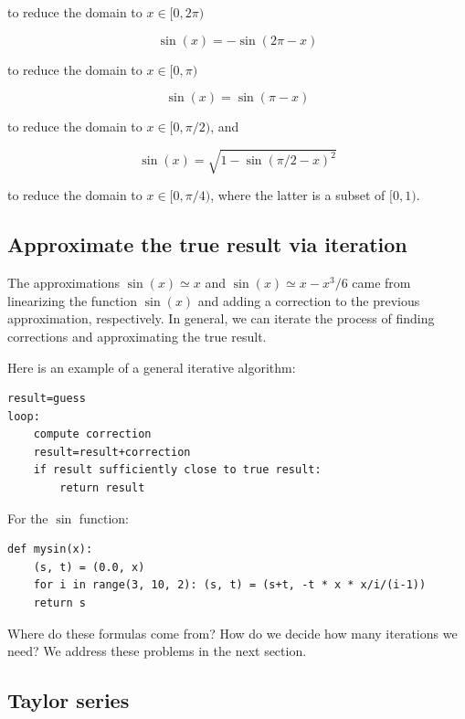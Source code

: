 \documentclass[justified, sixbynine]{tufte-book}
\theoremstyle{plain}%
\newtheorem * {corollary}{Corollary}
\theoremstyle{definition}
\theoremstyle{remark}
\newtheorem * {remark}{Remark}
\newtheorem * {note}{Note}
\begin{document}
\begin{fullwidth}
to reduce the domain to $x \in [0, 2\pi)$

\begin{equation}
\sin(x) = -\sin(2\pi - x)
\end{equation}

to reduce the domain to $x \in [0, \pi)$

\begin{equation}
\sin(x) = \sin(\pi - x)
\end{equation}

to reduce the domain to $x \in [0, \pi/2)$, and

\begin{equation}
\sin(x) = \sqrt{1 - \sin(\pi/2 - x)^2}
\end{equation}

to reduce the domain to $x \in [0, \pi/4)$, where the latter is a subset of $[0, 1)$.

\goodbreak\subsection{Approximate the true result via iteration}


The approximations $\sin(x) \simeq x$ and $\sin(x) \simeq x - x^3/6$ came from linearizing the function $\sin(x)$ and adding a correction to the previous approximation, respectively. In general, we can iterate the process of finding corrections and approximating the true result.

Here is an example of a general iterative algorithm:
\begin{lstlisting}
result=guess
loop:
    compute correction
    result=result+correction
    if result sufficiently close to true result:
        return result
\end{lstlisting}

For the $\sin$ function:

\begin{lstlisting}
def mysin(x):
    (s, t) = (0.0, x)
    for i in range(3, 10, 2): (s, t) = (s+t, -t * x * x/i/(i-1))
    return s
\end{lstlisting}

Where do these formulas come from? How do we decide how many iterations we need? We address these problems in the next section.


\goodbreak\subsection{Taylor series}


\end{fullwidth}
\end{document}
